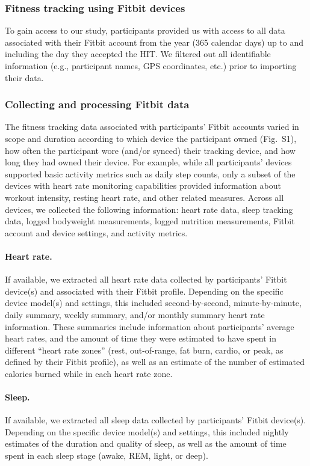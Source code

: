 \documentclass[10pt]{article}
\newcommand{\devices}{S1}
\begin{document}
\subsubsection*{Fitness tracking using Fitbit devices}
To gain access to our study, participants provided us with access to
all data associated with their Fitbit account from the year (365
calendar days) up to and including the day they accepted the HIT.  We
filtered out all identifiable information (e.g., participant names,
GPS coordinates, etc.) prior to importing their data.

\subsubsection*{Collecting and processing Fitbit data}

The fitness tracking data associated with participants' Fitbit
accounts varied in scope and duration according to which device the
participant owned (Fig.~\devices), how often the participant wore
(and/or synced) their tracking device, and how long they had owned
their device.  For example, while all participants' devices supported
basic activity metrics such as daily step counts, only a subset of the
devices with heart rate monitoring capabilities provided information
about workout intensity, resting heart rate, and other related
measures.  Across all devices, we collected the following information:
heart rate data, sleep tracking data, logged bodyweight measurements,
logged nutrition measurements, Fitbit account and device settings, and
activity metrics.

\paragraph{Heart rate.}  If available, we extracted all heart rate
data collected by participants' Fitbit device(s) and associated with
their Fitbit profile.  Depending on the specific device model(s) and
settings, this included second-by-second, minute-by-minute, daily
summary, weekly summary, and/or monthly summary heart rate
information.  These summaries include information about participants'
average heart rates, and the amount of time they were estimated to
have spent in different ``heart rate zones'' (rest, out-of-range, fat
burn, cardio, or peak, as defined by their Fitbit profile), as well as
an estimate of the number of estimated calories burned while in each
heart rate zone.

\paragraph{Sleep.}  If available, we extracted all sleep data
collected by participants' Fitbit device(s).  Depending on the
specific device model(s) and settings, this included nightly estimates
of the duration and quality of sleep, as well as the amount of time
spent in each sleep stage (awake, REM, light, or deep).
\end{document}
